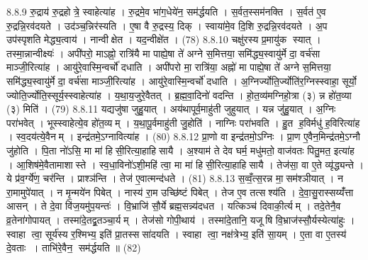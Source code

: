 8.8.9
रु॒द्राय॑ रु॒द्रहोत्रे॒ स्वाहेत्या॑ह । रु॒द्रमे॒व भा॑ग॒धेये॑न॒ सम॑र्द्धयति । स॒र्वत॒स्सम॑नक्ति । स॒र्वत॑ ए॒व रु॒द्रन्नि॒रव॑दयते । उद॑ञ्च॒न्निर॑स्यति । ए॒षा वै रु॒द्रस्य॒ दिक् । स्वाया॑मे॒व दि॒शि रु॒द्रन्नि॒रव॑दयते । अ॒प उप॑स्पृशति मेद्ध्य॒त्वाय॑ । नान्वीक्षेत । यद॒न्वीक्षे॑त । (78)
8.8.10
चक्षु॑रस्य प्र॒मायु॑क स्यात् । तस्मा॒न्नान्वीक्ष्यः॑ । अपी॑परो॒ माऽह्नो॒ रात्रि॑यै मा पाह्ये॒षा ते॑ अग्ने स॒मित्तया॒ समि॑द्ध्य॒स्वायु॑र्मे दा॒ वर्च॑सा माञ्जी॒रित्या॑ह । आयु॑रे॒वास्मि॒न्वर्चो॑ दधाति । अपी॑परो मा॒ रात्रि॑या॒ अह्नो॑ मा पाह्ये॒षा ते॑ अग्ने स॒मित्तया॒ समि॑द्ध्य॒स्वायु॑र्मे दा॒ वर्च॑सा माञ्जी॒रित्या॑ह । आयु॑रे॒वास्मि॒न्वर्चो॑ दधाति । अ॒ग्निर्ज्योति॒र्ज्योति॑र॒ग्निस्स्वाहा॒ सूर्यो॒ ज्योति॒र्ज्योति॒स्सूर्य॒स्स्वाहेत्या॑ह । य॒था॒य॒जुरे॒वैतत् । ब्र॒ह्म॒वा॒दिनो॑ वदन्ति । हो॒त॒व्य॑मग्निहो॒त्रा (३) न्न हो॑त॒व्या (३) मिति॑ । (79)
8.8.11
यद्यजु॑षा जुहु॒यात् । अय॑थापूर्व॒माहु॑ती जुहुयात् । यन्न जु॑हु॒यात् । अ॒ग्निः परा॑भवेत् । भूस्स्वाहेत्ये॒व हो॑त॒व्यम् । य॒था॒पू॒र्वमाहु॑ती जु॒होति॑ । नाग्निः परा॑भवति । हु॒त ह॒विर्मधु॑ ह॒विरित्या॑ह । स्व॒दय॑त्ये॒वैनम् । इन्द्र॑तमे॒ऽग्नावित्या॑ह । (80)
8.8.12
प्रा॒णो वा इन्द्र॑तमो॒ऽग्निः । प्रा॒ण ए॒वैन॒मिन्द्र॑तमे॒ऽग्नौ जु॑होति । पि॒ता नो॑ऽसि॒ मा मा॑ हिसी॒रित्या॒हाहिसायै । अ॒श्याम॑ ते देव घर्म॒ मधु॑मतो॒ वाज॑वतः पितु॒मत॒ इत्या॑ह । आ॒शिष॑मे॒वैतामाशास्ते । स्व॒धा॒विनो॑ऽशी॒महि॑ त्वा॒ मा मा॑ हिसी॒रित्या॒हाहिसायै । तेज॑सा॒ वा ए॒ते व्यृ॑द्ध्यन्ते । ये प्र॑व॒र्ग्ये॑ण॒ चर॑न्ति । प्राश्ञ॑न्ति । तेज॑ ए॒वात्मन्द॑धते । (81)
8.8.13
स॒व्वँ॒त्स॒रन्न मा॒सम॑श्ञीयात् । न रा॒मामुपे॑यात् । न मृ॒न्मये॑न पिबेत् । नास्य॑ रा॒म उच्छि॑ष्टं पिबेत् । तेज ए॒व तत्सश्य॑ति । दे॒वा॒सु॒रास्सय्यँ॑त्ता आसन् । ते दे॒वा वि॑ज॒यमु॑प॒यन्तः॑ । वि॒भ्राजि॑ सौ॒र्ये ब्रह्म॒सन्न्य॑दधत । यत्किञ्च॑ दिवाकी॒र्त्यम् । तदे॒तेनै॒व व्र॒तेना॑गोपायत् । तस्मा॑दे॒तद्व्र॒तञ्चा॒र्यम् । तेज॑सो गोपी॒थाय॑ । तस्मा॑दे॒तानि॒ यजूषि वि॒भ्राज॑स्सौ॒र्यस्येत्या॑हुः । स्वाहा त्वा॒ सूर्य॑स्य र॒श्मिभ्य॒ इति॑ प्रा॒तस्ससा॑दयति । स्वाहा त्वा॒ नक्ष॑त्रेभ्य॒ इति॑ सा॒यम् । ए॒ता वा ए॒तस्य॑ दे॒वताः । ताभि॑रे॒वैन॒ सम॑र्द्धयति ॥ (82)
\anuvakamend

